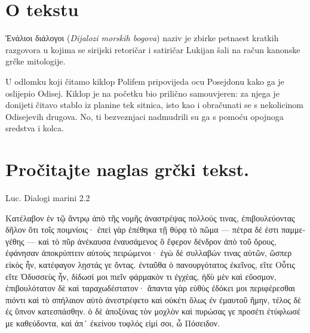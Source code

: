 


\section*{O tekstu}

Ἐνάλιοι διάλογοι (\textit{Dijalozi morskih bogova}) naziv je zbirke petnaest kratkih razgovora u kojima se sirijski retoričar i satiričar Lukijan šali na račun kanonske grčke mitologije.

U odlomku koji čitamo kiklop Polifem pripovijeda ocu Posejdonu kako ga je oslijepio Odisej. Kiklop je na početku bio prilično samouvjeren: za njega je donijeti čitavo stablo iz planine tek sitnica, isto kao i obračunati se s nekolicinom Odisejevih drugova. No, ti bezveznjaci nadmudrili su ga s pomoću opojnoga sredstva i kolca.



\section*{Pročitajte naglas grčki tekst.}

Luc. Dialogi marini 2.2


\medskip


{\large

\begin{greek}

\noindent Κατέλαβον ἐν τῷ ἄντρῳ ἀπὸ τῆς νομῆς ἀναστρέψας πολλούς τινας, ἐπιβουλεύοντας δῆλον ὅτι τοῖς ποιμνίοις· ἐπεὶ γὰρ ἐπέθηκα τῇ θύρᾳ τὸ πῶμα — πέτρα δέ ἐστι παμμεγέθης — καὶ τὸ πῦρ ἀνέκαυσα ἐναυσάμενος ὃ ἔφερον δένδρον ἀπὸ τοῦ ὄρους, ἐφάνησαν ἀποκρύπτειν αὑτοὺς πειρώμενοι· ἐγὼ δὲ συλλαβών τινας αὐτῶν, ὥσπερ εἰκὸς ἦν, κατέφαγον λῃστάς γε ὄντας. ἐνταῦθα ὁ πανουργότατος ἐκεῖνος, εἴτε Οὖτις εἴτε Ὀδυσσεὺς ἦν, δίδωσί μοι πιεῖν φάρμακόν τι ἐγχέας, ἡδὺ μὲν καὶ εὔοσμον, ἐπιβουλότατον δὲ καὶ ταραχωδέστατον· ἅπαντα γὰρ εὐθὺς ἐδόκει μοι περιφέρεσθαι πιόντι καὶ τὸ σπήλαιον αὐτὸ ἀνεστρέφετο καὶ οὐκέτι ὅλως ἐν ἐμαυτοῦ ἤμην, τέλος δὲ ἐς ὕπνον κατεσπάσθην. ὁ δὲ ἀποξύνας τὸν μοχλὸν καὶ πυρώσας γε προσέτι ἐτύφλωσέ με καθεύδοντα, καὶ ἀπ´ ἐκείνου τυφλός εἰμί σοι, ὦ Πόσειδον.


\end{greek}

}


